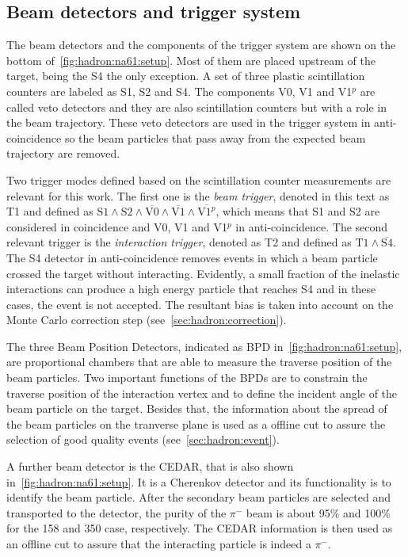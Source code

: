 \subsection{Beam detectors and trigger system}
\label{sec:hadron:na61:trigger}

The beam detectors and the components of the trigger system are shown
on the bottom of~\cref{fig:hadron:na61:setup}. Most of them are placed upstream of
the target, being the S4 the only exception. A set of three plastic
scintillation counters are labeled as S1, S2 and S4. The components
V0, V1 and V1$^p$ are called veto detectors and they are also scintillation
counters but with a role in the beam trajectory. These veto detectors
are used in the trigger system in anti-coincidence so the beam particles
that pass away from the expected beam trajectory are removed.

Two trigger modes defined based on the scintillation counter measurements
are relevant for this work. The first one is the \emph{beam trigger},
denoted in this text as T1 and defined as 
$\text{S1}\wedge\text{S2}\wedge\overline{\text{V0}}\wedge\overline{\text{V1}}\wedge\overline{\text{V1}^p}$,
which means that S1 and S2 are considered in coincidence and V0, V1 and V1$^p$ in anti-coincidence.
The second relevant trigger is the \emph{interaction trigger}, denoted as T2
and defined as 
$\text{T1}\wedge\overline{\text{S4}}$.
The S4 detector in anti-coincidence removes events in which a beam
particle crossed the target without interacting. Evidently,
a small fraction of the inelastic interactions can produce
a high energy particle that reaches S4 and in these cases, the
event is not accepted. The resultant bias is taken into
account on the Monte Carlo correction step (see~\cref{sec:hadron:correction}).

The three Beam Position Detectors, indicated as BPD in~\cref{fig:hadron:na61:setup},
are proportional chambers that are able to measure the traverse position
of the beam particles. Two important functions of the BPDs are to constrain
the traverse position of the interaction vertex and to define the
incident angle of the beam particle on the target. Besides that,
the information about the spread of the beam particles on the
tranverse plane is used as a offline cut to assure the
selection of good quality events (see~\cref{sec:hadron:event}).

A further beam detector is the CEDAR, that is also shown
in~\cref{fig:hadron:na61:setup}. It is a Cherenkov detector
and its functionality is to identify the beam particle.
After the secondary beam particles are selected and
transported to the \NASixtyOne detector, the purity of the
$\pi^-$ beam is about 95\% and 100\% for the 158 and 350 \GeVc
case, respectively. The CEDAR information is then used as
an offline cut to assure that the interacting particle
is indeed a $\pi^-$.


